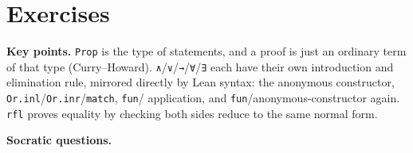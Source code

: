 \section{Exercises}\label{sec:03-propositions-and-proofs:08-exercises:1}

\textbf{Key points.} \texttt{Prop} is the type of statements, and a proof is just an ordinary term of that type (Curry--Howard). \texttt{∧}/\texttt{∨}/\texttt{→}/\texttt{∀}/\texttt{∃} each have their own introduction and elimination rule, mirrored directly by Lean syntax: the anonymous constructor, \texttt{Or.inl}/\texttt{Or.inr}/\texttt{match}, \texttt{fun}/ application, and \texttt{fun}/anonymous-constructor again. \texttt{rfl} proves equality by checking both sides reduce to the same normal form.

\textbf{Socratic questions.}

